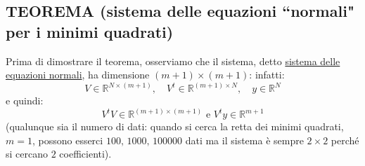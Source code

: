 \subsection{TEOREMA (sistema delle equazioni ``normali" per i minimi quadrati)}
\begin{center}
\end{center}
Prima di dimostrare il teorema, osserviamo che il sistema, detto \uline{sistema delle equazioni normali}, ha dimensione $(m+1) \times  (m+1)$: infatti:
\[
	V \in \mathbb{R}^{N \times (m+1)}, \quad V^t \in \mathbb{R}^{(m+1) \times N}, \quad y \in \mathbb{R}^{N}
\]
e quindi:
\[
	V^tV \in \mathbb{R}^{(m+1) \times (m+1)} \text{ e } V^ty \in \mathbb{R}^{m+1}
\]
(qualunque sia il numero di dati: quando si cerca la retta dei minimi quadrati, $m=1$, possono esserci $100, \, 1000, \, 100000$ dati ma il sistema è sempre $2 \times 2$ perché si cercano $2$ coefficienti).

